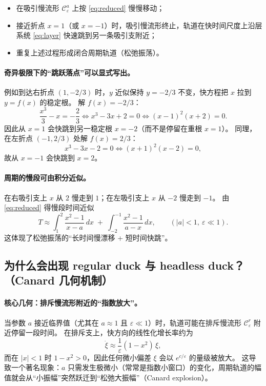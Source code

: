 \documentclass[a4paper,twoside,openany,UTF8]{article}  %
\numberwithin{equation}{section}  %
\numberwithin{equation}{section}  %
\begin{document}
\begin{itemize}
	\item 在吸引慢流形 $\mathcal C_\varepsilon^{a}$ 上按 \eqref{eq:reduced} 慢慢移动；
	\item 接近折点 $x=1$（或 $x=-1$）时，吸引慢流形终止，轨道在快时间尺度上沿层系统 \eqref{eq:layer} 快速跳到另一条吸引支附近；
	\item 重复上述过程形成闭合周期轨道（松弛振荡）。
\end{itemize}

\paragraph{奇异极限下的“跳跃落点”可以显式写出。}
例如到达右折点 $(1,-2/3)$ 时，$y$ 近似保持 $y=-2/3$ 不变，快方程把 $x$ 拉到 $y=f(x)$ 的稳定根。
解 $f(x)=-2/3$：
\[
\frac{x^3}{3}-x=-\frac{2}{3}
\iff x^3-3x+2=0
\iff (x-1)^2(x+2)=0.
\]
因此从 $x=1$ 会快跳到另一稳定根 $x=-2$（而不是停留在重根 $x=1$）。
同理，在左折点 $(-1,2/3)$ 处解 $f(x)=2/3$：
\[
x^3-3x-2=0 \iff (x+1)^2(x-2)=0,
\]
故从 $x=-1$ 会快跳到 $x=2$。

\paragraph{周期的慢段可由积分近似。}
在右吸引支上 $x$ 从 $2$ 慢走到 $1$；在左吸引支上 $x$ 从 $-2$ 慢走到 $-1$。
由 \eqref{eq:reduced} 得慢段时间近似
\begin{equation}\label{eq:period}
	T \approx \int_{1}^{2}\frac{x^2-1}{x-a}\,dx \;+\; \int_{-2}^{-1}\frac{x^2-1}{a-x}\,dx,
	\qquad (|a|<1,\ \varepsilon\ll1).
\end{equation}
这体现了松弛振荡的“长时间慢漂移 + 短时间快跳”。

\subsection{为什么会出现 regular duck 与 headless duck？（Canard 几何机制）}

\paragraph{核心几何：排斥慢流形附近的“指数放大”。}
当参数 $a$ 接近临界值（尤其在 $a\approx 1$ 且 $\varepsilon\ll1$）时，轨道可能在排斥慢流形 $\mathcal C_\varepsilon^{r}$ 附近停留一段时间。
在排斥支上，快方向的线性化增长率约为
\[
\dot \xi \approx \frac{1}{\varepsilon}(1-x^2)\,\xi,
\]
而在 $|x|<1$ 时 $1-x^2>0$，因此任何微小偏差 $\xi$ 会以 $e^{c/\varepsilon}$ 的量级被放大。
这导致一个著名现象：$a$ 只需发生极微小（常常是指数小窗口）的变化，周期轨道的幅值就会从“小振幅”突然跃迁到“松弛大振幅”（Canard explosion）。
\end{document}
